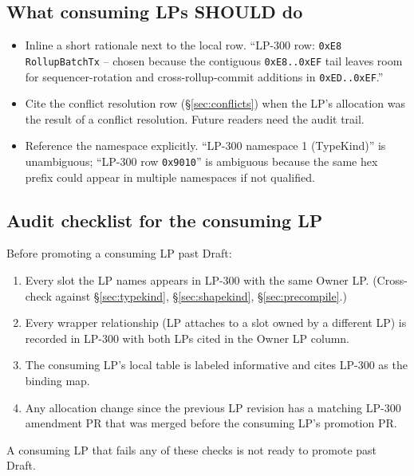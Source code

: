\subsection{What consuming LPs SHOULD do}

\begin{itemize}[leftmargin=2em,nosep]
\item Inline a short rationale next to the local row. ``LP-300 row:
  \texttt{0xE8} \texttt{RollupBatchTx} -- chosen because the contiguous
  \texttt{0xE8..0xEF} tail leaves room for sequencer-rotation and
  cross-rollup-commit additions in \texttt{0xED..0xEF}.''
\item Cite the conflict resolution row (\S\ref{sec:conflicts}) when
  the LP's allocation was the result of a conflict resolution. Future
  readers need the audit trail.
\item Reference the namespace explicitly. ``LP-300 namespace 1
  (TypeKind)'' is unambiguous; ``LP-300 row \texttt{0x9010}'' is
  ambiguous because the same hex prefix could appear in multiple
  namespaces if not qualified.
\end{itemize}

\subsection{Audit checklist for the consuming LP}

Before promoting a consuming LP past Draft:

\begin{enumerate}[leftmargin=2em,nosep]
\item Every slot the LP names appears in LP-300 with the same Owner
  LP. (Cross-check against \S\ref{sec:typekind},
  \S\ref{sec:shapekind}, \S\ref{sec:precompile}.)
\item Every wrapper relationship (LP attaches to a slot owned by a
  different LP) is recorded in LP-300 with both LPs cited in the
  Owner LP column.
\item The consuming LP's local table is labeled informative and
  cites LP-300 as the binding map.
\item Any allocation change since the previous LP revision has a
  matching LP-300 amendment PR that was merged before the consuming
  LP's promotion PR.
\end{enumerate}

A consuming LP that fails any of these checks is not ready to
promote past Draft.
